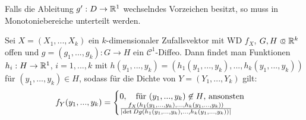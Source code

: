\documentclass{cheat-sheet}
\newcommand{\E}{\mathbb{E}} %
\begin{document}
\iffalse
  \begin{bsp}
    $Y = e^{N (\mu, \sigma^2)} + c$

    Dann heißt $Y$ logarithmisch normalverteilt

    $g(x) = e^x + c$

    Ausgelassen: Rechnungen
  \end{bsp}
\fi



\begin{bem}
  Falls die Ableitung $g' : D \to \mathbb{R}^1$ wechselndes Vorzeichen besitzt, so muss in Monotoniebereiche unterteilt werden.
\end{bem}

\iffalse
  \begin{bsp}
    $Y = e^{N(\mu, \sigma^2) + c}$, speziell $\mu = 0$, $\sigma^2 = 1$, $c = 0$, dann
    \[ f_Y(y) = \frac{1}{\sqrt{2 \pi}} \exp(- \frac{(\log y)^2}{2}). \]
  \end{bsp}


  Die Funktion
  \[ f_a(y) \coloneqq f_Y(y) \cdot (1 + a \cdot \sin(2 \pi \log y)), y \in \R_{>0}^1, a \in [0,1] \]

  Für $a \in [0,1]$ ist dann $\Int{-\infty}{\infty}{f_a(y)}{y} = 1$

  \[ \E Y^n = \Int{0}{\infty}{y^n f_Y(y)}{y} = ... = \exp(- \frac{n^2}{2}) \]

  und

  \[ \Int{0}{\infty}{y^n f_a(y)}{y} = \exp(- \frac{n^2}{2}) \]
\fi



\iffalse
  Sei $X = (X_1, ..., X_k)$ ein $k$-dimensionaler Zufallsvektor,
  $g = (g_1, ..., g_k) : \R^k \to \R^k$ mit $g_i : \R^k \to \R^1$ für $i = 1, ..., k$ Borel-messbar.
  Dann ist $Y = g(X)$ ein $k$-dimensionaler ZV mit $P_Y = P_X \circ g^{-1}$
  Falls $f_{(X_1, ..., X_k)}$ eine W-Dichte von $X$ ist und $g$ ein $\mathcal{C}^1$-Diffeomorphismus ist, dann existiert die W-Dichte von $f_{(Y_1, ..., Y_k)}$ von $Y$.
\fi

\begin{satz}
  Sei $X = (X_1, ..., X_k)$ ein $k$-dimensionaler Zufallsvektor mit WD $f_X$, $G, H \opn \R^k$ offen und $g = (g_1, ..., g_k) : G \to H$ ein $\mathcal{C}^1$-Diffeo.
  Dann findet man Funktionen $h_i : H \to \mathbb{R}^1$, $i = 1, ..., k$ mit $h(y_1, ..., y_k) = (h_1(y_1, ..., y_k), ..., h_k(y_1, ..., y_k))$ für $(y_1, ..., y_k) \in H$, sodass für die Dichte von $Y = (Y_1, ..., Y_k)$ gilt:
  \[
    f_{Y}(y_1, ..., y_k) = \begin{cases}
      0, \quad \text{für $(y_1, ..., y_k) \not\in H$, ansonsten} \\
      \tfrac{f_{X}(h_1(y_1, ..., y_k), ..., h_k(y_1, ..., y_k))}{\lvert\det D g(h_1(y_1, ..., y_k), ..., h_k(y_1, ..., y_k))\rvert}
    \end{cases}
  \]
\end{satz}
\end{document}
